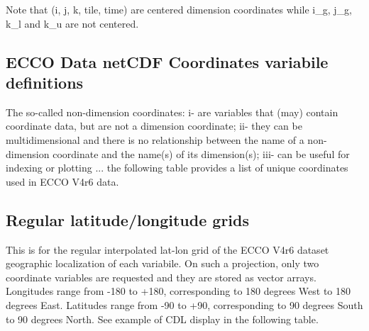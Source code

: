 \par Note that (i, j, k, tile, time) are centered dimension coordinates while i\_g, j\_g, k\_l and k\_u are not centered.

\newpage

\subsection{ECCO Data netCDF Coordinates variabile definitions}
The so-called non-dimension coordinates: i- are variables that (may) contain coordinate data, but are not a dimension coordinate; ii- they can be multidimensional and there is no relationship between the name of a non-dimension coordinate and the name(s) of its dimension(s); iii- can be useful for indexing or plotting ... the following table provides a list of unique coordinates used in ECCO V4r6 data.


\subsection*{Regular latitude/longitude grids}
\par This is for the regular interpolated lat-lon grid of the ECCO V4r6 dataset geographic localization of each variabile. On such a projection, only two coordinate variables are requested and they are stored as vector arrays. Longitudes range from -180 to +180, corresponding to 180 degrees West to 180 degrees East. Latitudes range from -90 to +90, corresponding to 90 degrees South to 90 degrees North. See example of CDL display in the following table.


